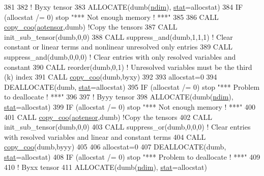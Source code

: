 \begin{DoxyCode}
381 
382     \textcolor{comment}{! Byxy tensor}
383     \textcolor{keyword}{ALLOCATE}(dumb(\hyperlink{namespaceparams_a2323fe1773f086e20c14f266351c482b}{ndim}), \hyperlink{namespacestat}{stat}=allocstat)
384     \textcolor{keywordflow}{IF} (allocstat /= 0) stop \textcolor{stringliteral}{"*** Not enough memory ! ***"}
385 
386     \textcolor{keyword}{CALL }\hyperlink{namespacetensor_a14f95c256cdf137ca0767ddb3c87deea}{copy\_coo}(\hyperlink{namespaceaotensor__def_a0dc43bc9294a18f2fe57b67489f1702f}{aotensor},dumb) \textcolor{comment}{!Copy the tensors}
387     \textcolor{keyword}{CALL }init\_sub\_tensor(dumb,0,0)
388     \textcolor{keyword}{CALL }suppress\_and(dumb,1,1,1) \textcolor{comment}{! Clear constant or linear terms and nonlinear unresolved only entries}
389     \textcolor{keyword}{CALL }suppress\_and(dumb,0,0,0) \textcolor{comment}{! Clear entries with only resolved variables and constant}
390     \textcolor{keyword}{CALL }reorder(dumb,0,1) \textcolor{comment}{! Unresolved variables must be the third (k) index}
391     \textcolor{keyword}{CALL }\hyperlink{namespacetensor_a14f95c256cdf137ca0767ddb3c87deea}{copy\_coo}(dumb,byxy)
392 
393     allocstat=0
394     \textcolor{keyword}{DEALLOCATE}(dumb, \hyperlink{namespacestat}{stat}=allocstat)
395     \textcolor{keywordflow}{IF} (allocstat /= 0)  stop \textcolor{stringliteral}{"*** Problem to deallocate ! ***"}
396 
397     \textcolor{comment}{! Byyy tensor}
398     \textcolor{keyword}{ALLOCATE}(dumb(\hyperlink{namespaceparams_a2323fe1773f086e20c14f266351c482b}{ndim}), \hyperlink{namespacestat}{stat}=allocstat)
399     \textcolor{keywordflow}{IF} (allocstat /= 0) stop \textcolor{stringliteral}{"*** Not enough memory ! ***"}
400 
401     \textcolor{keyword}{CALL }\hyperlink{namespacetensor_a14f95c256cdf137ca0767ddb3c87deea}{copy\_coo}(\hyperlink{namespaceaotensor__def_a0dc43bc9294a18f2fe57b67489f1702f}{aotensor},dumb) \textcolor{comment}{!Copy the tensors}
402     \textcolor{keyword}{CALL }init\_sub\_tensor(dumb,0,0)
403     \textcolor{keyword}{CALL }suppress\_or(dumb,0,0,0) \textcolor{comment}{! Clear entries with resolved variables and linear and constant terms}
404     \textcolor{keyword}{CALL }\hyperlink{namespacetensor_a14f95c256cdf137ca0767ddb3c87deea}{copy\_coo}(dumb,byyy)
405 
406     allocstat=0
407     \textcolor{keyword}{DEALLOCATE}(dumb, \hyperlink{namespacestat}{stat}=allocstat)
408     \textcolor{keywordflow}{IF} (allocstat /= 0)  stop \textcolor{stringliteral}{"*** Problem to deallocate ! ***"}
409 
410     \textcolor{comment}{! Byxx tensor}
411     \textcolor{keyword}{ALLOCATE}(dumb(\hyperlink{namespaceparams_a2323fe1773f086e20c14f266351c482b}{ndim}), \hyperlink{namespacestat}{stat}=allocstat)

\end{DoxyCode}
